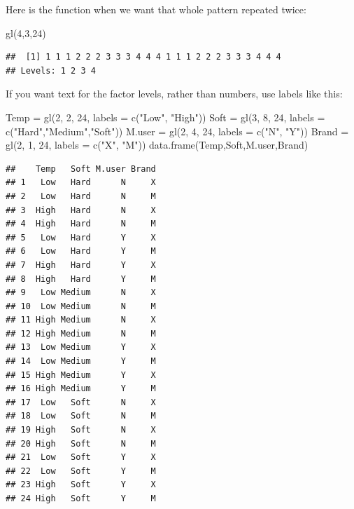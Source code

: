 \documentclass[
]{book}
\newenvironment{Shaded}{\begin{snugshade}}{\end{snugshade}}
\newcommand{\AttributeTok}[1]{\textcolor[rgb]{0.77,0.63,0.00}{#1}}
\newcommand{\DecValTok}[1]{\textcolor[rgb]{0.00,0.00,0.81}{#1}}
\newcommand{\FunctionTok}[1]{\textcolor[rgb]{0.00,0.00,0.00}{#1}}
\newcommand{\NormalTok}[1]{#1}
\newcommand{\OtherTok}[1]{\textcolor[rgb]{0.56,0.35,0.01}{#1}}
\newcommand{\StringTok}[1]{\textcolor[rgb]{0.31,0.60,0.02}{#1}}
\theoremstyle{definition}
\theoremstyle{definition}
\theoremstyle{definition}
\theoremstyle{definition}
\theoremstyle{remark}
\begin{document}
Here is the function when we want that whole pattern repeated twice:

\begin{Shaded}
\begin{Highlighting}[]
\FunctionTok{gl}\NormalTok{(}\DecValTok{4}\NormalTok{,}\DecValTok{3}\NormalTok{,}\DecValTok{24}\NormalTok{)}
\end{Highlighting}
\end{Shaded}

\begin{verbatim}
##  [1] 1 1 1 2 2 2 3 3 3 4 4 4 1 1 1 2 2 2 3 3 3 4 4 4
## Levels: 1 2 3 4
\end{verbatim}

If you want text for the factor levels, rather than numbers, use labels like this:

\begin{Shaded}
\begin{Highlighting}[]
\NormalTok{Temp }\OtherTok{=} \FunctionTok{gl}\NormalTok{(}\DecValTok{2}\NormalTok{, }\DecValTok{2}\NormalTok{, }\DecValTok{24}\NormalTok{, }\AttributeTok{labels =} \FunctionTok{c}\NormalTok{(}\StringTok{"Low"}\NormalTok{, }\StringTok{"High"}\NormalTok{))}
\NormalTok{Soft }\OtherTok{=} \FunctionTok{gl}\NormalTok{(}\DecValTok{3}\NormalTok{, }\DecValTok{8}\NormalTok{, }\DecValTok{24}\NormalTok{, }\AttributeTok{labels =} \FunctionTok{c}\NormalTok{(}\StringTok{"Hard"}\NormalTok{,}\StringTok{"Medium"}\NormalTok{,}\StringTok{"Soft"}\NormalTok{))}
\NormalTok{M.user }\OtherTok{=} \FunctionTok{gl}\NormalTok{(}\DecValTok{2}\NormalTok{, }\DecValTok{4}\NormalTok{, }\DecValTok{24}\NormalTok{, }\AttributeTok{labels =} \FunctionTok{c}\NormalTok{(}\StringTok{"N"}\NormalTok{, }\StringTok{"Y"}\NormalTok{))}
\NormalTok{Brand }\OtherTok{=} \FunctionTok{gl}\NormalTok{(}\DecValTok{2}\NormalTok{, }\DecValTok{1}\NormalTok{, }\DecValTok{24}\NormalTok{, }\AttributeTok{labels =} \FunctionTok{c}\NormalTok{(}\StringTok{"X"}\NormalTok{, }\StringTok{"M"}\NormalTok{))}
\FunctionTok{data.frame}\NormalTok{(Temp,Soft,M.user,Brand)}
\end{Highlighting}
\end{Shaded}

\begin{verbatim}
##    Temp   Soft M.user Brand
## 1   Low   Hard      N     X
## 2   Low   Hard      N     M
## 3  High   Hard      N     X
## 4  High   Hard      N     M
## 5   Low   Hard      Y     X
## 6   Low   Hard      Y     M
## 7  High   Hard      Y     X
## 8  High   Hard      Y     M
## 9   Low Medium      N     X
## 10  Low Medium      N     M
## 11 High Medium      N     X
## 12 High Medium      N     M
## 13  Low Medium      Y     X
## 14  Low Medium      Y     M
## 15 High Medium      Y     X
## 16 High Medium      Y     M
## 17  Low   Soft      N     X
## 18  Low   Soft      N     M
## 19 High   Soft      N     X
## 20 High   Soft      N     M
## 21  Low   Soft      Y     X
## 22  Low   Soft      Y     M
## 23 High   Soft      Y     X
## 24 High   Soft      Y     M
\end{verbatim}
\end{document}
